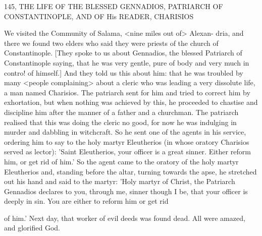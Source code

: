 145, THE LIFE OF THE BLESSED GENNADIOS,
PATRIARCH OF CONSTANTINOPLE,
AND OF His READER, CHARISIOS

We visited the Community of Salama, <nine miles out of> Alexan-
dria, and there we found two elders who said they were priests of
the church of Constantinople.
[They spoke to us about Gennadios,
the blessed Patriarch of Constantinople saying, that he was very
gentle, pure of body and very much in contro! of himself.] And they
told us this about him: that he was troubled by many <people
complaining> about a cleric who was leading a very dissolute life,
a man named Charisios.
The patriarch sent for him and tried to
correct him by exhortation, but when nothing was achieved by this,
he proceeded to chastise and discipline him after the manner of a
father and a churchman.
The patriarch realised that this was doing
the cleric no good, for now he was indulging in murder and
dabbling in witchcraft.
So he sent one of the agents in his service,
ordering him to say to the holy martyr Eleutherios (in whose
oratory Charisios served as lector): 'Saint Eleutherios, your officer
is a great sinner.
Either reform him, or get rid of him.' So the agent
came to the oratory of the holy martyr Eleutherios and, standing
before the altar, turning towards the apse, he stretched out his hand
and said to the martyr: 'Holy martyr of Christ, the Patriarch
Gennadios declares to you, through me, sinner though I be, that
your officer is deeply in sin.
You are either to reform him or get rid

of him.' Next day, that worker of evil deeds was found dead.
All
were amazed, and glorified God.

